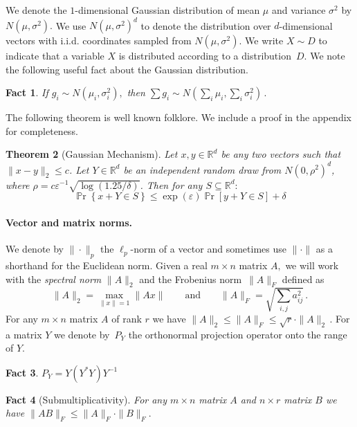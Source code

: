 \documentclass[letterpaper,11pt]{article}
\newtheorem{theorem}{Theorem}[section]
\newtheorem{fact}[theorem]{Fact}
\theoremstyle{definition}
\newcommand{\factlabel}[1]{\label{fact:#1}}
\newcommand{\Psymb}{\mathbb{P}}
\DeclareMathOperator*{\ProbOp}{\Psymb r}
\renewcommand{\Pr}{\ProbOp}
\newcommand{\mper}{\,.}
\renewcommand{\leq}{\leqslant}
\renewcommand{\le}{\leqslant}
\newcommand{\Set}[1]{\left\{#1\right\}}
\renewcommand{\epsilon}{\varepsilon}
\begin{document}
We denote the $1$-dimensional Gaussian distribution of mean $\mu$ and
variance $\sigma^2$ by $N(\mu,\sigma^2).$ We use $N(\mu,\sigma^2)^d$ to denote
the distribution over $d$-dimensional vectors with i.i.d. coordinates sampled from
$N(\mu,\sigma^2).$ We write $X\sim D$ to indicate that a
variable $X$ is distributed according to a distribution~$D.$ We note
the following useful fact about the Gaussian distribution.
\begin{fact}\factlabel{gaussian-sum}
If $g_i\sim N(\mu_i,\sigma_i^2),$ then
$\sum g_i \sim N\left(\sum_i\mu_i,\sum_i\sigma_i^2\right)\mper$
\end{fact}
The following theorem is well known folklore. We include a proof in the appendix for completeness.

\begin{theorem}[Gaussian Mechanism]
\label{thm:Gaussian}
Let $x, y \in \mathbb{R}^d$ be any two vectors such that $\|x-y\|_2 \leq c$.
Let $Y \in \mathbb{R}^d$ be an independent random draw from $N(0,\rho^2)^d$,
where $\rho = c\epsilon^{-1}\sqrt{\log(1.25/\delta)}$. Then for any $S
\subseteq \mathbb{R}^d:$ $$\Pr\Set{x + Y \in S} \leq \exp(\epsilon)\Pr[y + Y
\in S] + \delta$$
\end{theorem}

\paragraph{Vector and matrix norms.} We denote by $\|\cdot\|_p$ the
$\ell_p$-norm of a vector and sometimes use $\|\cdot\|$ as a shorthand for the
Euclidean norm. Given a real $m\times n$ matrix $A,$ we will work with the
\emph{spectral norm} $\|A\|_2$ and the Frobenius norm~$\|A\|_F$ defined as
\begin{equation}\textstyle
\|A\|_2  =\max_{\|x\|=1}\|Ax\|\qquad\text{and}
\qquad \|A\|_F =\sqrt{\sum_{i,j}a_{ij}^2}\mper
\end{equation}
For any $m\times n$ matrix $A$ of rank $r$ we have
$\|A\|_2\le\|A\|_F\le\sqrt{r}\cdot\|A\|_2\mper$
For a matrix $Y$ we denote by~$P_Y$
the orthonormal projection operator onto the range of $Y.$
\begin{fact}\label{fac:projection}
$P_Y=Y(Y^*Y)Y^{-1}$
\end{fact}

\begin{fact}[Submultiplicativity]\factlabel{sub}
For any $m\times n$ matrix $A$ and $n\times r$ matrix $B$ we have
$\|AB\|_F\le\|A\|_F\cdot\|B\|_F.$
\end{fact}
\end{document}
